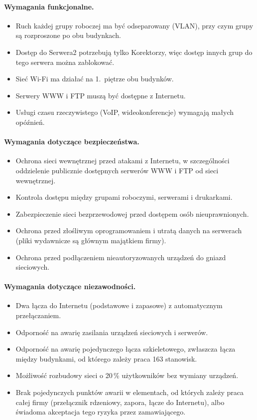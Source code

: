 \documentclass[12pt,a4paper]{article}
\begin{document}
\paragraph{Wymagania funkcjonalne.}
\begin{itemize}
  \item Ruch każdej grupy roboczej ma być odseparowany (VLAN), przy czym grupy
  są rozproszone po obu budynkach.
  \item Dostęp do Serwera2 potrzebują tylko Korektorzy, więc dostęp innych
  grup do tego serwera można zablokować.
  \item Sieć Wi-Fi ma działać na 1.~piętrze obu budynków.
  \item Serwery WWW i FTP muszą być dostępne z Internetu.
  \item Usługi czasu rzeczywistego (VoIP, wideokonferencje) wymagają
  małych opóźnień.
\end{itemize}

\paragraph{Wymagania dotyczące bezpieczeństwa.}
\begin{itemize}
  \item Ochrona sieci wewnętrznej przed atakami z Internetu, w szczególności
  oddzielenie publicznie dostępnych serwerów WWW i FTP od sieci wewnętrznej.
  \item Kontrola dostępu między grupami roboczymi, serwerami i drukarkami.
  \item Zabezpieczenie sieci bezprzewodowej przed dostępem osób
  nieuprawnionych.
  \item Ochrona przed złośliwym oprogramowaniem i utratą danych na serwerach
  (pliki wydawnicze są głównym majątkiem firmy).
  \item Ochrona przed podłączeniem nieautoryzowanych urządzeń do gniazd
  sieciowych.
\end{itemize}

\paragraph{Wymagania dotyczące niezawodności.}
\begin{itemize}
  \item Dwa łącza do Internetu (podstawowe i zapasowe) z automatycznym
  przełączaniem.
  \item Odporność na awarię zasilania urządzeń sieciowych i serwerów.
  \item Odporność na awarię pojedynczego łącza szkieletowego, zwłaszcza
  łącza między budynkami, od którego zależy praca 163 stanowisk.
  \item Możliwość rozbudowy sieci o 20\,\% użytkowników bez wymiany
  urządzeń.
  \item Brak pojedynczych punktów awarii w elementach, od których zależy
  praca całej firmy (przełącznik rdzeniowy, zapora, łącze do Internetu),
  albo świadoma akceptacja tego ryzyka przez zamawiającego.
\end{itemize}
\end{document}
